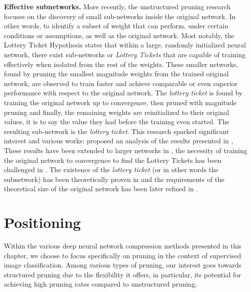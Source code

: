 \noindent\textbf{Effective subnetworks.} More recently, the unstructured pruning
research focuses on the discovery of small sub-networks inside the original
network. In other words, to identify a subset of weight that can perform, under
certain conditions or assumptions, as well as the original network. Most
notably, the Lottery Ticket Hypothesis \cite{DBLP:conf/iclr/FrankleC19} states
that within a large, randomly initialized neural network, there exist
sub-networks or \emph{Lottery Tickets} that are capable of training effectively
when isolated from the rest of the weights. These smaller networks, found by
pruning the smallest magnitude weights from the trained original network, are
observed to train faster and achieve comparable or even superior performance
with respect to the original network. The \emph{lottery ticket} is found by
training the original network up to convergence, then pruned with magnitude
pruning and finally, the remaining weights are reinitialized to their original
values, it is to say the value they had before the training even started. The
resulting sub-network is the \emph{lottery ticket}. This research sparked
significant interest and various works: \cite{DBLP:conf/nips/ZhouLLY19} proposed
an analysis of the results presented in \cite{DBLP:conf/iclr/FrankleC19}, These
results \cite{DBLP:conf/iclr/FrankleC19} have been extended to larger networks
in \cite{DBLP:journals/corr/abs-1903-01611}, the necessity of training the
original network to convergence to find the Lottery Tickets has been challenged
in \cite{DBLP:conf/iclr/LiuSZHD19}. The existence of the \emph{lottery ticket}
(or in other words the subnetwork) has been theoretically proven in
\cite{DBLP:conf/icml/MalachYSS20} and the requirements of the theoretical size
of the original network has been later refined in
\cite{DBLP:conf/nips/PensiaRNVP20,DBLP:conf/nips/OrseauHR20}.\\

\section{Positioning}

Within the various deep neural network compression methods presented in this
chapter, we choose to focus specifically on pruning in the context of supervised
image classification. Among various types of pruning, our interest goes towards
structured pruning due to the flexibility it offers, in particular, its
potential for achieving high pruning rates compared to unstructured pruning.\\

